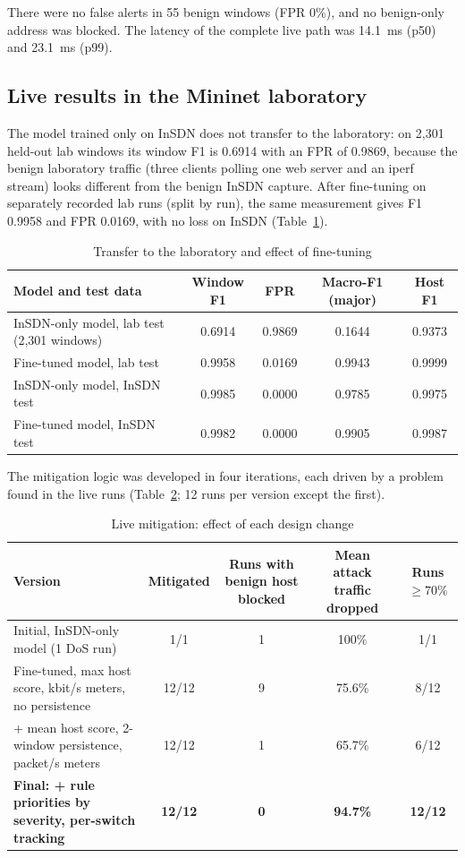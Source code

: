 There were no false alerts in 55 benign windows (FPR 0\%), and no benign-only address was blocked. The latency of the complete live path was 14.1~ms (p50) and 23.1~ms (p99).

\subsection{Live results in the Mininet laboratory}

The model trained only on InSDN does not transfer to the laboratory: on 2,301 held-out lab windows its window F1 is 0.6914 with an FPR of 0.9869, because the benign laboratory traffic (three clients polling one web server and an iperf stream) looks different from the benign InSDN capture. After fine-tuning on separately recorded lab runs (split by run), the same measurement gives F1 0.9958 and FPR 0.0169, with no loss on InSDN (Table~\ref{tab:finetune}).

\begin{table}[htbp]
\centering
\caption{Transfer to the laboratory and effect of fine-tuning}
\label{tab:finetune}
\small
\begin{tabular}{|l|c|c|c|c|}
\hline
\textbf{Model and test data} & \textbf{Window F1} & \textbf{FPR} & \textbf{Macro-F1 (major)} & \textbf{Host F1} \\ \hline
InSDN-only model, lab test (2,301 windows) & 0.6914 & 0.9869 & 0.1644 & 0.9373 \\ \hline
Fine-tuned model, lab test & 0.9958 & 0.0169 & 0.9943 & 0.9999 \\ \hline
InSDN-only model, InSDN test & 0.9985 & 0.0000 & 0.9785 & 0.9975 \\ \hline
Fine-tuned model, InSDN test & 0.9982 & 0.0000 & 0.9905 & 0.9987 \\ \hline
\end{tabular}
\end{table}

The mitigation logic was developed in four iterations, each driven by a problem found in the live runs (Table~\ref{tab:mitigation}; 12 runs per version except the first).

\begin{table}[htbp]
\centering
\caption{Live mitigation: effect of each design change}
\label{tab:mitigation}
\small
\begin{tabularx}{\textwidth}{|X|c|c|c|c|}
\hline
\textbf{Version} & \textbf{Mitigated} & \textbf{Runs with benign host blocked} & \textbf{Mean attack traffic dropped} & \textbf{Runs $\ge 70\%$} \\ \hline
Initial, InSDN-only model (1 DoS run) & 1/1 & 1 & 100\% & 1/1 \\ \hline
Fine-tuned, max host score, kbit/s meters, no persistence & 12/12 & 9 & 75.6\% & 8/12 \\ \hline
+ mean host score, 2-window persistence, packet/s meters & 12/12 & 1 & 65.7\% & 6/12 \\ \hline
\textbf{Final: + rule priorities by severity, per-switch tracking} & \textbf{12/12} & \textbf{0} & \textbf{94.7\%} & \textbf{12/12} \\ \hline
\end{tabularx}
\end{table}

